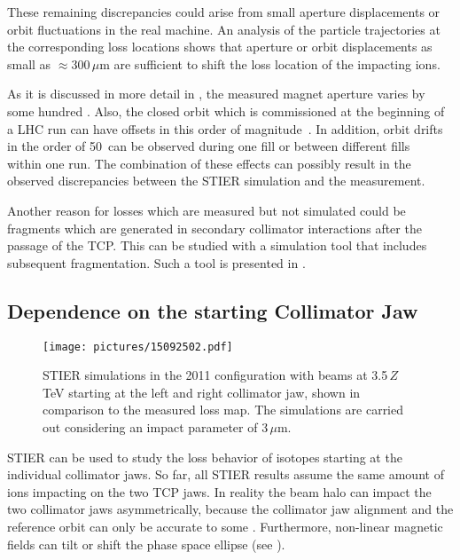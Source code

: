 These remaining discrepancies could arise from small aperture displacements or orbit fluctuations in the real machine. An analysis of the particle trajectories at the corresponding loss locations shows that aperture or orbit displacements as small as $\approx 300\,\mu$m are sufficient to shift the loss location of the impacting ions. 

As it is discussed in more detail in , the measured magnet aperture varies by some hundred \mum. Also, the closed orbit which is commissioned at the beginning of a LHC run can have offsets in this order of magnitude~\cite{Redaelli:private}. In addition, orbit drifts in the order of 50\mum\, can be observed during one fill or between different fills~\cite{wenn:private} within one run. The combination of these effects can possibly result in the observed discrepancies between the STIER simulation and the measurement. 

Another reason for losses which are measured but not simulated could be fragments which are generated in secondary collimator interactions after the passage of the TCP. This can be studied with a simulation tool that includes subsequent fragmentation. Such a tool is presented in .


\subsection{Dependence on the starting Collimator Jaw}

\begin{figure}[t]
  \begin{center}
\texttt{[image: pictures/15092502.pdf]}
\caption{STIER simulations in the 2011 configuration with \lead beams at 3.5\,$Z$\,TeV starting at the left and right collimator jaw, shown in comparison to the measured loss map. The simulations are carried out considering an impact parameter of $3\,\mu$m. }
\label{fig:15032201.pdf}
  \end{center}
\end{figure}

STIER can be used to study the loss behavior of isotopes starting at the individual collimator jaws. So far, all STIER results assume the same amount of ions impacting on the two TCP jaws. In reality the beam halo can impact the two collimator jaws asymmetrically, because the collimator jaw alignment and the reference orbit can only be accurate to some \mum. Furthermore, non-linear magnetic fields can tilt or shift the phase space ellipse (see ).

